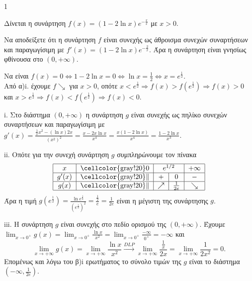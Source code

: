 \begin{ylh}{1}
    \item [Ύλη από εικόνα]
\end{ylh}
\begin{alist}
    \item []Δίνεται η συνάρτηση $f(x)=(1-2\ln x)e^{-\frac{x}{x}}$ με $x>0$.
    \begin{rlist}
        \item Να αποδείξετε ότι η συνάρτηση $f$ είναι συνεχής ως άθροισμα συνεχών συναρτήσεων και παραγωγίσιμη με $f'(x)=(1-2\ln x)e^{-\frac{2}{x}}$. Άρα η συνάρτηση είναι γνησίως φθίνουσα στο $(0, +\infty)$. 
        \item Να είναι $f(x)=0 \Leftrightarrow 1-2\ln x = 0 \Leftrightarrow \ln x = \frac{1}{2} \Leftrightarrow x=e^{\frac{1}{2}}$. \\
            Από α)i. έχουμε $f \searrow$ για $x>0$, οπότε $x<e^{\frac{1}{2}} \Rightarrow f(x)>f\left(e^{\frac{1}{2}}\right) \Rightarrow f(x)>0$ και $x>e^{\frac{1}{2}} \Rightarrow f(x)<f\left(e^{\frac{1}{2}}\right) \Rightarrow f(x)<0$. 
    \end{rlist}
    \item []
    \begin{rlist}
        \item i. Στο διάστημα $(0, +\infty)$ η συνάρτηση $g$ είναι συνεχής ως πηλίκο συνεχών συναρτήσεων και παραγωγίσιμη με $g'(x)=\frac{\frac{1}{x}x^2-(\ln x)2x}{(x^2)^2}=\frac{x-2x\ln x}{x^4}=\frac{x(1-2\ln x)}{x^4}=\frac{1-2\ln x}{x^3}$. 
        \item ii. Οπότε για την συνεχή συνάρτηση $g$ συμπληρώνουμε τον πίνακα
        \[
        \begin{tabular}{|c|c|c|c|c|}
            \hline
            $x$ & \cellcolor{gray!20}$0$ & \multicolumn{2}{c|}{$e^{1/2}$} & $+\infty$ \\
            \hline
            $g'(x)$ & \cellcolor{gray!20}$\|$ & $+$ & $0$ & $-$ \\
            \hline
            $g(x)$ & \cellcolor{gray!20}$\|$ & $\nearrow$ & $\frac{1}{2e}$ & $\searrow$ \\
            \hline
        \end{tabular}
        \]
        Άρα η τιμή $g\left(e^{\frac{1}{2}}\right)=\frac{\ln e^{\frac{1}{2}}}{\left(e^{\frac{1}{2}}\right)^2}=\frac{\frac{1}{2}}{e}=\frac{1}{2e}$ είναι η μέγιστη της συνάρτησης $g$. 
        \item iii. Η συνάρτηση $g$ είναι συνεχής στο πεδίο ορισμού της $(0, +\infty)$.
        Έχουμε $\lim_{x \to 0^+} g(x) = \lim_{x \to 0^+} \frac{\ln x}{x^2} = \lim_{x \to 0^+} \frac{-\infty}{0^+} = -\infty$ και
        \[
        \lim_{x \to +\infty} g(x) = \lim_{x \to +\infty} \frac{\ln x}{x^2} \xrightarrow{DLP} \lim_{x \to +\infty} \frac{\frac{1}{x}}{2x} = \lim_{x \to +\infty} \frac{1}{2x^2} = 0.
        \]
        Επομένως και λόγω του β)i ερωτήματος το σύνολο τιμών της $g$ είναι το διάστημα $\left(-\infty, \frac{1}{2e}\right)$. 
    \end{rlist}
\end{alist}